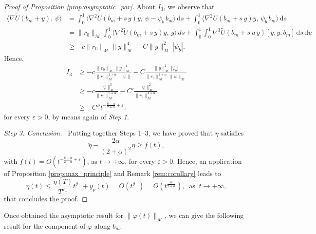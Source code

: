 \documentclass[a4paper,10pt]{amsart}
\newcommand{\ud}{\mathrm{d}}
\theoremstyle{plain}
\theoremstyle{definition}
\numberwithin{equation}{section}
\numberwithin{thm}{section}
\begin{document}
\begin{proof}[Proof of Proposition \ref{prop:asymptotic_par}]
About $I_3$, we observe that
\[
\begin{aligned}
    \langle \nabla \tilde U(b_m+y),\,\psi\rangle &= \int_0^1 \langle\nabla^2 \tilde U(b_m+s\,y)y,\,\psi-\psi_b\,b_m \rangle\,\ud s + \int_0^1\langle \nabla^2 \tilde U(b_m+s\,y)y,\,\psi_b\,b_m\rangle\,\ud s 
    \\
    & = \|r_0\|_\mathcal{M}\int_0^1 \langle\nabla^2 \tilde U(b_m+s\,y)y,\,y \rangle\,ds +\int_0^1\int_0^1 \nabla^3 \tilde U(b_m+s\,u\,y)[y,y,b_m]\,\ud s\,\ud u
    \\
    &\ge -c \|r_0\|_\mathcal{M}\|y\|_\mathcal{M}^4 -C \|y\|_\mathcal{M}^2\,|\psi_b|.
\end{aligned}
\]
Hence,
\[
\begin{aligned}
I_3 &\ge  -c \frac{\|r_0\|_\mathcal{M}\|y\|_\mathcal{M}^4}{\|r_0\|_\mathcal{M}^{2+\alpha}\|\psi\|} -C \frac{\|y\|_\mathcal{M}^2\,|\psi_b|}{\|r_0\|_\mathcal{M}^{2+\alpha}\,\|\psi\|_\mathcal{M}}
\\
&\ge -c \frac{\|\psi\|_\mathcal{M}^3}{\|r_0\|_\mathcal{M}^{5+\alpha}}-C'\frac{\|\psi\|_\mathcal{M}^2}{\|r_0\|_\mathcal{M}^{4+\alpha}}
\\
&\ge -C'' t^{-\frac{8-\alpha}{2+\alpha}+\varepsilon}.
\end{aligned}
\]
for every $\varepsilon>0$, by means again of {\em Step 1}.

\smallskip
\emph{Step 3. Conclusion.}
\ Putting together Steps 1--3, we have proved that $\eta$ satisfies
\[
\ddot \eta -\frac{2\alpha}{(2+\alpha)^2}\eta \ge f(t), 
\]
with $f(t)=O(t^{-\frac{8-\alpha}{2+\alpha}+\varepsilon})$, as $t\rightarrow+\infty$, for every $\varepsilon>0$. Hence, an application of Proposition \ref{prop:max_principle} and Remark \ref{rem:corollary} leads to  
\[
\eta(t) \le \frac{\eta(T)}{T^{\theta_-}}t^{\theta_-} + y_p(t)=O(t^{\theta_-})=O(t^\frac{\alpha}{2+\alpha}), \ \mbox{ as } \ t\rightarrow+\infty,
\]
that concludes the proof.

\end{proof}


Once obtained the asymptotic result for $\|\varphi(t)\|_\mathcal{M}$, we can give the following result for the component of $\varphi$ along $b_m$.
\end{document}
